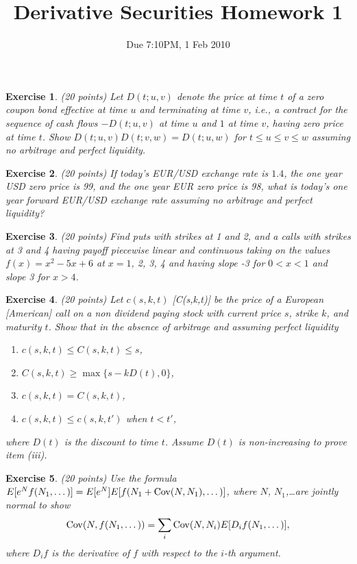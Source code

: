 \documentclass[11pt,fleqn]{amsproc}
\newcommand{\Cov}{\mathop{\rm{Cov}}}
\newtheorem{xca}{Exercise}
\begin{document}
\title{Derivative Securities Homework 1}
\author{Due 7:10PM, 1 Feb 2010}

\maketitle

\begin{xca}{(20 points)}
Let $D(t; u, v)$ denote the price at time $t$ of a zero coupon bond
effective at time $u$ and terminating at time $v$, i.e.,
a contract for the sequence of cash flows $-D(t; u, v)$ at time 
$u$ and $1$ at time $v$, having zero price at time $t$.
Show $D(t; u, v) D(t; v, w) = D(t; u, w)$ for $t\le u\le v\le w$
assuming no arbitrage and perfect liquidity.
\end{xca}

\begin{xca}{(20 points)}
If today's EUR/USD exchange rate is $1.4$, the one year USD zero price is 99,
and the one year EUR zero price is 98, what is today's one year forward 
EUR/USD exchange rate assuming no arbitrage and perfect liquidity?
\end{xca}

\begin{xca}{(20 points)}
Find puts with strikes at 1 and 2, and a calls with strikes
at 3 and 4 having payoff piecewise linear and continuous
taking on the values $f(x) = x^2 - 5x + 6$ at
$x = 1$, 2, 3, 4 and having slope -3 for $0 < x < 1$
and slope 3 for $x > 4$.
\end{xca}

\begin{xca}{(20 points)}
Let $c(s, k, t)$ [C(s,k,t)] be the price of a European [American] call
on a non dividend paying stock with current price $s$, strike $k$,
and maturity $t$. Show that in the absence of arbitrage and assuming
perfect liquidity
\begin{enumerate}
\item $c(s, k, t) \le C(s,k,t) \le s$,
\item $C(s, k, t) \ge \max\{s - kD(t),0\}$,
\item $c(s, k, t) = C(s, k, t)$,
\item $c(s, k, t) \le c(s, k, t')$ when $t < t'$,
\end{enumerate}
where $D(t)$ is the discount to time $t$. Assume
$D(t)$ is non-increasing to prove item (iii).
\end{xca}

\begin{xca}{(20 points)}
Use the formula $E[e^N f(N_1,\dots)] = E[e^N] E[f(N_1 + \Cov(N,
N_1),\dots)]$, where $N$, $N_1$,\dots are jointly normal to show
\begin{equation*}
\Cov(N,f(N_1,\dots)) = \sum_i \Cov(N,N_i) E[D_if(N_1,\dots)],
\end{equation*}
where $D_i f$ is the derivative of $f$ with respect to the $i$-th argument.
\end{xca}
\end{document}

